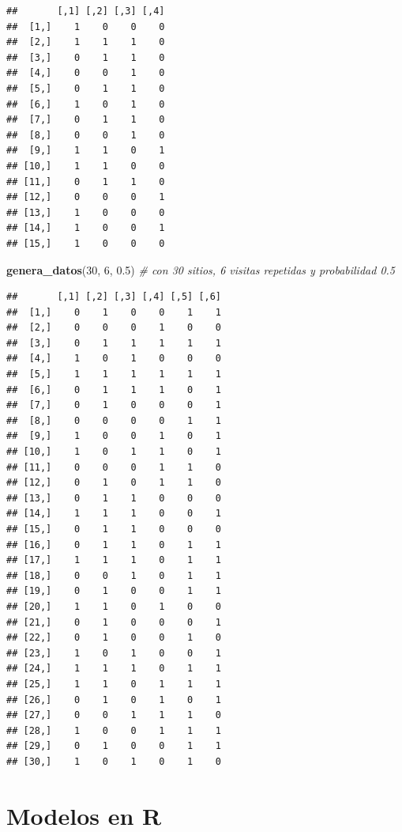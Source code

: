 \documentclass[
]{book}
\newenvironment{Shaded}{\begin{snugshade}}{\end{snugshade}}
\newcommand{\CommentTok}[1]{\textcolor[rgb]{0.56,0.35,0.01}{\textit{#1}}}
\newcommand{\DecValTok}[1]{\textcolor[rgb]{0.00,0.00,0.81}{#1}}
\newcommand{\FloatTok}[1]{\textcolor[rgb]{0.00,0.00,0.81}{#1}}
\newcommand{\KeywordTok}[1]{\textcolor[rgb]{0.13,0.29,0.53}{\textbf{#1}}}
\newcommand{\NormalTok}[1]{#1}
\begin{document}
\begin{verbatim}
##       [,1] [,2] [,3] [,4]
##  [1,]    1    0    0    0
##  [2,]    1    1    1    0
##  [3,]    0    1    1    0
##  [4,]    0    0    1    0
##  [5,]    0    1    1    0
##  [6,]    1    0    1    0
##  [7,]    0    1    1    0
##  [8,]    0    0    1    0
##  [9,]    1    1    0    1
## [10,]    1    1    0    0
## [11,]    0    1    1    0
## [12,]    0    0    0    1
## [13,]    1    0    0    0
## [14,]    1    0    0    1
## [15,]    1    0    0    0
\end{verbatim}

\begin{Shaded}
\begin{Highlighting}[]
\KeywordTok{genera_datos}\NormalTok{(}\DecValTok{30}\NormalTok{, }\DecValTok{6}\NormalTok{, }\FloatTok{0.5}\NormalTok{) }\CommentTok{# con 30 sitios, 6 visitas repetidas y probabilidad 0.5}
\end{Highlighting}
\end{Shaded}

\begin{verbatim}
##       [,1] [,2] [,3] [,4] [,5] [,6]
##  [1,]    0    1    0    0    1    1
##  [2,]    0    0    0    1    0    0
##  [3,]    0    1    1    1    1    1
##  [4,]    1    0    1    0    0    0
##  [5,]    1    1    1    1    1    1
##  [6,]    0    1    1    1    0    1
##  [7,]    0    1    0    0    0    1
##  [8,]    0    0    0    0    1    1
##  [9,]    1    0    0    1    0    1
## [10,]    1    0    1    1    0    1
## [11,]    0    0    0    1    1    0
## [12,]    0    1    0    1    1    0
## [13,]    0    1    1    0    0    0
## [14,]    1    1    1    0    0    1
## [15,]    0    1    1    0    0    0
## [16,]    0    1    1    0    1    1
## [17,]    1    1    1    0    1    1
## [18,]    0    0    1    0    1    1
## [19,]    0    1    0    0    1    1
## [20,]    1    1    0    1    0    0
## [21,]    0    1    0    0    0    1
## [22,]    0    1    0    0    1    0
## [23,]    1    0    1    0    0    1
## [24,]    1    1    1    0    1    1
## [25,]    1    1    0    1    1    1
## [26,]    0    1    0    1    0    1
## [27,]    0    0    1    1    1    0
## [28,]    1    0    0    1    1    1
## [29,]    0    1    0    0    1    1
## [30,]    1    0    1    0    1    0
\end{verbatim}

\hypertarget{modelos-en-r}{%
\chapter{Modelos en R}\label{modelos-en-r}}
\end{document}
